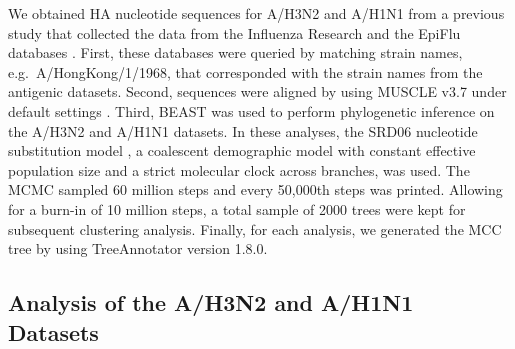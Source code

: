 \documentclass[11pt,oneside,letterpaper]{article}
\begin{document}
We obtained HA nucleotide sequences for A/H3N2 and A/H1N1 from a previous study \cite{bedford_integrating_2014} that collected the data from the Influenza Research \cite{IRD} and the EpiFlu databases \cite{GISAID}. 
First, these databases were queried by matching strain names, e.g.\ A/HongKong/1/1968, that corresponded with the strain names from the antigenic datasets.
Second, sequences were aligned by using MUSCLE v3.7 under default settings \cite{MUSCLE}.
Third, BEAST\cite{BEAST17} was used to perform phylogenetic inference on the A/H3N2 and A/H1N1 datasets.
In these analyses, the SRD06 nucleotide substitution model \cite{Shapiro06}, a coalescent demographic model with constant effective population size and a strict molecular clock across branches, was used.
The MCMC sampled 60 million steps and every 50,000th steps was printed.
Allowing for a burn-in of 10 million steps, a total sample of 2000 trees were kept for subsequent clustering analysis.
Finally, for each analysis, we generated the MCC tree by using TreeAnnotator version 1.8.0.





\subsection*{Analysis of the A/H3N2 and A/H1N1 Datasets}
\end{document}
